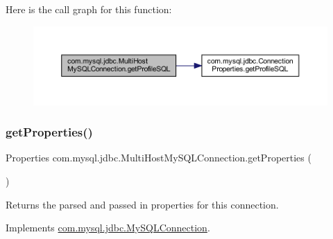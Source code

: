 Here is the call graph for this function\+:
\nopagebreak
\begin{figure}[H]
\begin{center}
\leavevmode
\includegraphics[width=350pt]{classcom_1_1mysql_1_1jdbc_1_1_multi_host_my_s_q_l_connection_a579cb97c35050ac81eea5afe7338122f_cgraph}
\end{center}
\end{figure}
\mbox{\label{classcom_1_1mysql_1_1jdbc_1_1_multi_host_my_s_q_l_connection_a06880fce49c4791eca1bf52761c51ab4}} 
\subsubsection{\texorpdfstring{get\+Properties()}{getProperties()}}
{\footnotesize\ttfamily Properties com.\+mysql.\+jdbc.\+Multi\+Host\+My\+S\+Q\+L\+Connection.\+get\+Properties (\begin{DoxyParamCaption}{ }\end{DoxyParamCaption})}

Returns the parsed and passed in properties for this connection. 

Implements \mbox{\hyperlink{interfacecom_1_1mysql_1_1jdbc_1_1_my_s_q_l_connection_a494cb1c438fb5e65b5fb9916c8331191}{com.\+mysql.\+jdbc.\+My\+S\+Q\+L\+Connection}}.

